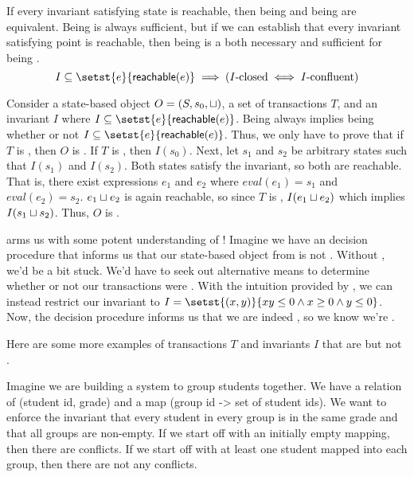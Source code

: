 \begin{claim}
  If every invariant satisfying state is reachable, then being \Iconfluent{}
  and being \Iclosed{} are equivalent. Being \Iclosed{} is always sufficient,
  but if we can establish that every invariant satisfying point is reachable,
  then being \Iclosed{} is a both necessary and sufficient for being
  \Iconfluent{}.
  \[
    I \subseteq \setst{e}{\reachable{e}} \implies
    (\text{\Iclosed{}} \iff \text{\Iconfluent})
  \]
\end{claim}
\begin{elidableproof}
  Consider a state-based object $O = (S, s_0, \sqcup)$, a set of transactions
  $T$, and an invariant $I$ where $I \subseteq \setst{e}{\reachable{e}}$.
  Being \Iclosed{} always implies being \Iconfluent{} whether or not $I
  \subseteq \setst{e}{\reachable{e}}$. Thus, we only have to prove that if $T$
  is \Iconfluent{}, then $O$ is \Iclosed. If $T$ is \Iconfluent{}, then
  $I(s_0)$. Next, let $s_1$ and $s_2$ be arbitrary states such that $I(s_1)$
  and $I(s_2)$. Both states satisfy the invariant, so both are reachable. That
  is, there exist expressions $e_1$ and $e_2$ where $eval(e_1) = s_1$  and
  $eval(e_2) = s_2$. $e_1 \sqcup e_2$ is again reachable, so since $T$ is
  \Iconfluent{}, $I(e_1 \sqcup e_2)$ which implies $I(s_1 \sqcup s_2)$. Thus, $O$
  is \Iclosed.
\end{elidableproof}

 arms us with some potent understanding of
\Iconfluence! Imagine we have an \Iclosed{} decision procedure that informs us
that our state-based object from  is not
\Iclosed{}. Without , we'd be a bit stuck. We'd
have to seek out alternative means to determine whether or not our transactions
were \Iconfluent{}. With the intuition provided by
, we can instead restrict our invariant to $I =
\setst{(x, y)}{xy \leq 0 \land x \geq 0 \land y \leq 0}$. Now, the \Iclosed{}
decision procedure informs us that we are indeed \Iclosed{}, so we know we're
\Iconfluent{}.

Here are some more examples of transactions $T$ and invariants $I$ that are
\Iconfluent{} but not \Iclosed{}. 

\begin{example}
  Imagine we are building a system to group students together. We have a relation
  of (student id, grade) and a map (group id -> set of student ids). We want to
  enforce the invariant that every student in every group is in the same grade
  and that all groups are non-empty. If we start off with an initially empty
  mapping, then there are conflicts. If we start off with at least one student
  mapped into each group, then there are not any conflicts.
\end{example}

